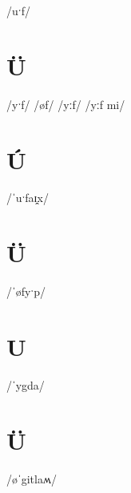 \documentclass[10pt,a4paper,twoside]{book}
\begin{document}
\begin{multicols}{3}
 {/uˑf/} {}
\end{multicols}

\section*{Ü}

\begin{multicols}{3}
 {/yˑf/} {}
 {/øf/} {}
 {/yːf/} {}
 {/yːf mi/} {}
\end{multicols}

\section*{Ú}

\begin{multicols}{3}
 {/ˈuˑfaɪ̯x/} {}
\end{multicols}

\section*{Ü}

\begin{multicols}{3}
 {/ˈøfyˑp/} {}
\end{multicols}

\section*{U}

\begin{multicols}{3}
 {/ˈygda/} {}
\end{multicols}

\section*{Ü}

\begin{multicols}{3}
 {/øˈgitlaʍ/} {}
\end{multicols}
\end{document}
